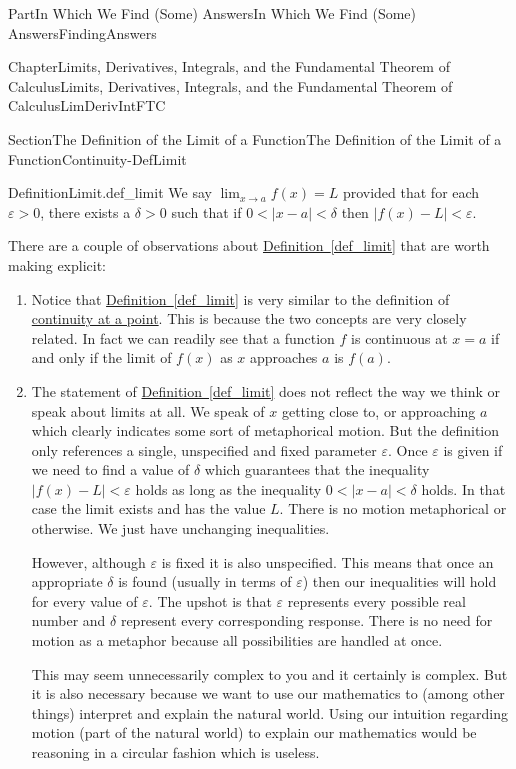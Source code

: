 \documentclass[oneside,10pt,]{book}
\newcommand{\xreffont}{\relax}
\numberwithin{equation}{part}
\newcommand{\abs}[1]{\left|#1\right|}
\def\limit#1#2#3{{\displaystyle\lim_{#1\rightarrow #2}#3}}
\newcommand{\eps}{\varepsilon}
\newcommand{\lt}{<}
\newcommand{\gt}{>}
\begin{document}
\begin{partptx}{Part}{In Which We Find (Some) Answers}{}{In Which We Find (Some) Answers}{}{}{FindingAnswers}
\begin{chapterptx}{Chapter}{Limits, Derivatives, Integrals, and the Fundamental Theorem of Calculus}{}{Limits, Derivatives, Integrals, and the Fundamental Theorem of Calculus}{}{}{LimDerivIntFTC}
\begin{sectionptx}{Section}{The Definition of the Limit of a Function}{}{The Definition of the Limit of a Function}{}{}{Continuity-DefLimit}
\begin{definition}{Definition}{Limit.}{def_limit}%
%
%
We say \(\limit{x}{a}{f(x)} =L\) provided that for each \(\eps\gt0\), there exists a \(\delta\gt0\) such that if \(0\lt \abs{x-a}\lt \delta\) then \(\abs{f(x)-L}\lt
\eps\).%
\end{definition}
There are a couple of observations about \hyperref[def_limit]{Definition~{\xreffont\ref{def_limit}}} that are worth making explicit:%
\begin{enumerate}
\item{}Notice that \hyperref[def_limit]{Definition~{\xreffont\ref{def_limit}}} is very similar to the definition of \hyperref[def_continuity]{continuity at a point}.   This is because the two concepts are very closely related. In fact we can readily see that a function \(f\) is continuous at \(x=a\) if and only if the limit of \(f(x)\) as \(x\) approaches \(a\) is \(f(a)\).%
\item{}The statement of \hyperref[def_limit]{Definition~{\xreffont\ref{def_limit}}} does not reflect the way we think or speak about limits at all. We speak of \(x\) getting close to, or approaching \(a\) which clearly indicates some sort of metaphorical motion. But the definition only references a single, unspecified and fixed parameter \(\eps{}\). Once \(\eps \) is given if we need to find a value of \(\delta{}\) which guarantees that the inequality \(\abs{f(x)-L}\lt \eps \) holds as long as the inequality \(0\lt \abs{x-a}\lt \delta\) holds. In that case the limit exists and has the value \(L\). There is no motion metaphorical or otherwise. We just have unchanging inequalities.%
\par
However, although \(\eps \) is fixed it is also unspecified. This means that once an appropriate \(\delta{}\) is found (usually in terms of \(\eps{}\)) then our inequalities will hold for every value of \(\eps{}\). The upshot is that \(\eps \) represents every possible real number and \(\delta{}\) represent every corresponding response. There is no need for motion as a metaphor because all possibilities are handled at once.%
\par
This may seem unnecessarily complex to you and it certainly is complex. But it is also necessary because we want to use our mathematics to (among other things) interpret and explain the natural world. Using our intuition regarding motion (part of the natural world) to explain our mathematics would be reasoning in a circular fashion which is useless.%
\end{enumerate}

\end{sectionptx}
\end{chapterptx}
\end{partptx}
\end{document}
